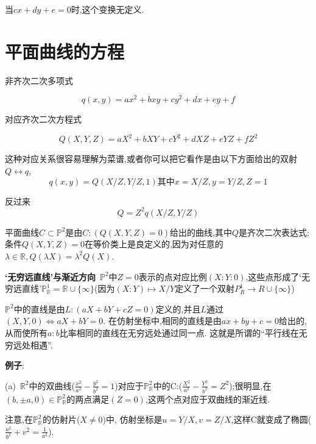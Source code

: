 \documentclass[UTF8]{book}
\begin{document}
		当$ cx+dy+e=0 $时,这个变换无定义.
	\section{平面曲线的方程}
		非齐次二次多项式
		
		\begin{equation*}
				q(x,y)=ax^{2}+bxy+cy^{2}+dx+ey+f
		\end{equation*}
	
		对应齐次二次方程式
		
		\begin{equation*}
			Q(X,Y,Z)=aX^{2}+bXY+cY^{2}+dXZ+eYZ+fZ^{2}
		\end{equation*}
		
		这种对应关系很容易理解为菜谱,或者你可以把它看作是由以下方面给出的双射$Q  \longleftrightarrow q$,
		\begin{equation*}
			q(x,y)=Q(X/Z,Y/Z,1) \text{其中} x=X/Z,y=Y/Z,Z=1
		\end{equation*}
	
	
		反过来
		\begin{equation*}
			Q=Z^{2}q(X/Z,Y/Z)
		\end{equation*}
	
		平面曲线$C\subset \mathbb{P}^{2}$是由$ C:(Q(X,Y,Z)=0) $给出的曲线,其中$ Q $是齐次二次表达式;条件$ Q(X,Y,Z)=0 $在等价类上是良定义的,因为对任意的$\lambda \in \mathbb{R}, Q(\lambda X)=\lambda^{2}Q(X)$.
		
		
		\textbf{‘无穷远直线’与渐近方向}\
		$\mathbb{P}^{2}$中$ Z=0 $表示的点对应比例$ (X:Y:0) $,这些点形成了‘无穷远直线’$\mathbb{P}^{1}_{\mathbb{R}}=\mathbb{R} \cup \{ \infty \}$(因为$(X:Y)\mapsto X/Y$定义了一个双射$P^{1}_{R} \rightarrow R \cup \{ \infty \}$)
		
		
		 $\mathbb{P}^{2}$中的直线是由$ L:(aX+bY+cZ=0) $定义的,并且$ L $通过$(X,Y,0)\Longleftrightarrow aX+bY=0$. 在仿射坐标中,相同的直线是由$ ax+by+c=0 $给出的,从而使所有$a : b$比率相同的直线在无穷远处通过同一点. 这就是所谓的“平行线在无穷远处相遇”.
		
		
		\textbf{例子}:
		
		
		(a)\ $\mathbb{R}^{2}$中的双曲线($\frac{x^{2}}{a^{2}}-\frac{y^{2}}{b^{2}}=1$)对应于$\mathbb{P}^{2}_{\mathbb{R}}$中的C:($\frac{X^{2}}{a^{2}}-\frac{Y^{2}}{b^{2}}=Z^{2}$);很明显,在$(b,±a,0)\in \mathbb{P}^{2}_{\mathbb{R}}$的两点满足$ (Z=0) $,这两个点对应于双曲线的渐近线.
		
		
		注意,在$\mathbb{P}^{2}_{\mathbb{R}}$的仿射片($X\neq 0$)中, 仿射坐标是$ u=Y/X,v=Z/X $,这样C就变成了椭圆($\frac{u^{2}}{b^{2}}+v^{2}=\frac{1}{a^{2}}$).
		
\end{document}
